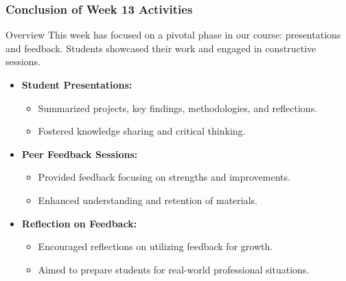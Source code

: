 \documentclass[aspectratio=169]{beamer}
\begin{document}
\begin{frame}[fragile]
    \frametitle{Conclusion of Week 13 Activities}
    
    \begin{block}{Overview}
        This week has focused on a pivotal phase in our course: presentations and feedback.
        Students showcased their work and engaged in constructive sessions.
    \end{block}
    
    \begin{itemize}
        \item \textbf{Student Presentations:}
            \begin{itemize}
                \item Summarized projects, key findings, methodologies, and reflections.
                \item Fostered knowledge sharing and critical thinking.
            \end{itemize}
        
        \item \textbf{Peer Feedback Sessions:}
            \begin{itemize}
                \item Provided feedback focusing on strengths and improvements.
                \item Enhanced understanding and retention of materials.
            \end{itemize}
        
        \item \textbf{Reflection on Feedback:}
            \begin{itemize}
                \item Encouraged reflections on utilizing feedback for growth.
                \item Aimed to prepare students for real-world professional situations.
            \end{itemize}
    \end{itemize}
\end{frame}
\end{document}
